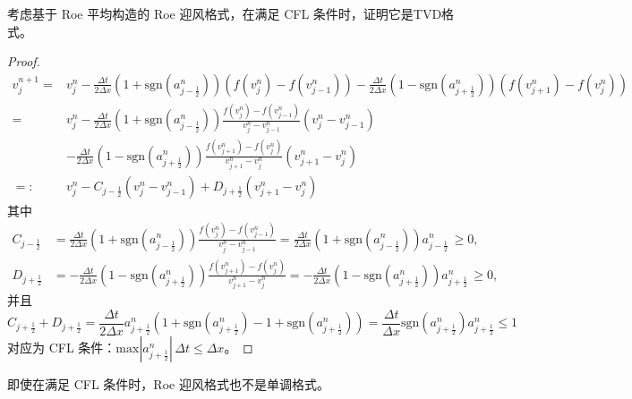 \begin{example}
    考虑基于 Roe 平均构造的 Roe 迎风格式，在满足 CFL 条件时，证明它是TVD格式。
\end{example}

\begin{proof}
    {\small
        \begin{align*}
            v_j^{n+1} ={} & v_j^n - \frac{\Delta t}{2\Delta x}
            (1+\text{sgn}(a_{j-\frac12}^n))(f(v_{j}^n)-f(v_{j-1}^n))
            - \frac{\Delta t}{2\Delta x} (1-\text{sgn}(a_{j+\frac12}^n))(f(v_{j+1}^n)-f(v_{j}^n))                                                            \\
            ={}           & v_j^n - \frac{\Delta t}{2\Delta x}
            (1+\text{sgn}(a_{j-\frac12}^n))\frac{f(v_{j}^n)-f(v_{j-1}^n)}{v_{j}^n-v_{j-1}^n}(v_{j}^n-v_{j-1}^n)                                              \\
                          & - \frac{\Delta t}{2\Delta x} (1-\text{sgn}(a_{j+\frac12}^n))\frac{f(v_{j+1}^n)-f(v_{j}^n)}{v_{j+1}^n-v_{j}^n}(v_{j+1}^n-v_{j}^n) \\
            =:{}          & v_j^n - C_{j-\frac12}(v_j^n - v_{j-1}^n) + D_{j+\frac12}(v_{j+1}^n - v_j^n)
        \end{align*}}
    其中
    \begin{align*}
        C_{j-\frac12} & = \frac{\Delta t}{2\Delta x}
        (1+\text{sgn}(a_{j-\frac12}^n))\frac{f(v_{j}^n)-f(v_{j-1}^n)}{v_{j}^n-v_{j-1}^n}
        = \frac{\Delta t}{2\Delta x}
        (1+\text{sgn}(a_{j-\frac12}^n)) a_{j-\frac12}^n \,\ge 0 , \\
        D_{j+\frac12} & = - \frac{\Delta t}{2\Delta x}
        (1-\text{sgn}(a_{j+\frac12}^n))\frac{f(v_{j+1}^n)-f(v_{j}^n)}{v_{j+1}^n-v_{j}^n}
        = -\frac{\Delta t}{2\Delta x}
        (1-\text{sgn}(a_{j+\frac12}^n)) a_{j+\frac12}^n \,\ge 0 ,
    \end{align*}
    并且
    \[
        C_{j+\frac12} + D_{j+\frac12}
        ={}  \frac{\Delta t}{2\Delta x} a_{j+\frac12}^n
        (1+\text{sgn}(a_{j+\frac12}^n)-1+\text{sgn}(a_{j+\frac12}^n))
        ={} \frac{\Delta t}{\Delta x}
        \text{sgn}(a_{j+\frac12}^n)  a_{j+\frac12}^n \le 1
    \]
    对应为 CFL 条件：$\text{max}|a_{j+\frac12}^n| \, \Delta t \le \Delta x$。
\end{proof}

\begin{remark}
    即使在满足 CFL 条件时，Roe 迎风格式也不是单调格式。
\end{remark}


